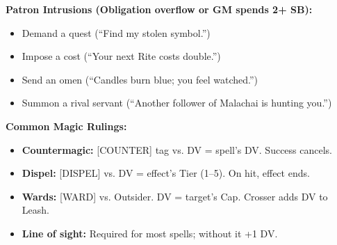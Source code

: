 \textbf{Patron Intrusions (Obligation overflow or GM spends 2+ SB):}
\begin{itemize}
  \item Demand a quest (``Find my stolen symbol.'')
  \item Impose a cost (``Your next Rite costs double.'')
  \item Send an omen (``Candles burn blue; you feel watched.'')
  \item Summon a rival servant (``Another follower of Malachai is hunting you.'')
\end{itemize}

\textbf{Common Magic Rulings:}
\begin{itemize}
  \item \textbf{Countermagic:} [COUNTER] tag vs. DV = spell's DV. Success cancels.
  \item \textbf{Dispel:} [DISPEL] vs. DV = effect's Tier (1--5). On hit, effect ends.
  \item \textbf{Wards:} [WARD] vs. Outsider. DV = target's Cap. Crosser adds DV to Leash.
  \item \textbf{Line of sight:} Required for most spells; without it +1 DV.
\end{itemize}
